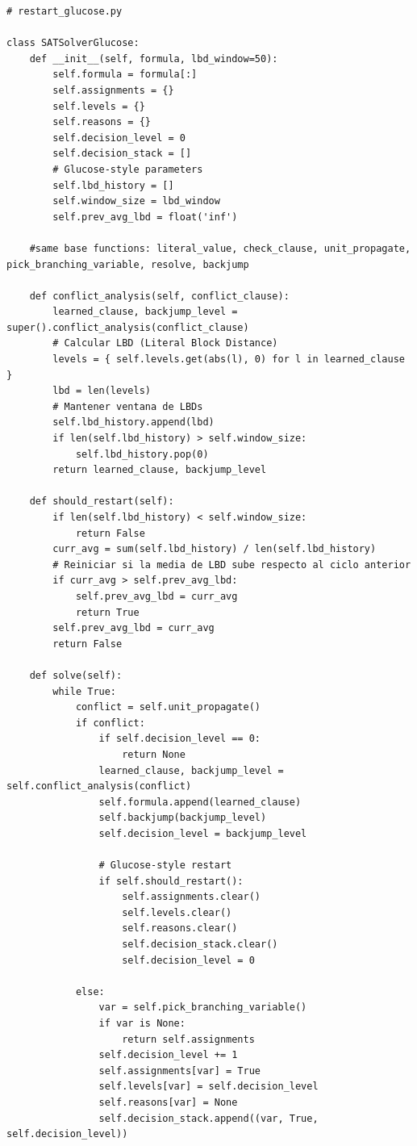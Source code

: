 \begin{lstlisting}
# restart_glucose.py

class SATSolverGlucose:
    def __init__(self, formula, lbd_window=50):
        self.formula = formula[:]  
        self.assignments = {}
        self.levels = {}
        self.reasons = {}
        self.decision_level = 0
        self.decision_stack = []
        # Glucose-style parameters
        self.lbd_history = []
        self.window_size = lbd_window
        self.prev_avg_lbd = float('inf')

    #same base functions: literal_value, check_clause, unit_propagate, pick_branching_variable, resolve, backjump

    def conflict_analysis(self, conflict_clause):
        learned_clause, backjump_level = super().conflict_analysis(conflict_clause)
        # Calcular LBD (Literal Block Distance)
        levels = { self.levels.get(abs(l), 0) for l in learned_clause }
        lbd = len(levels)
        # Mantener ventana de LBDs
        self.lbd_history.append(lbd)
        if len(self.lbd_history) > self.window_size:
            self.lbd_history.pop(0)
        return learned_clause, backjump_level

    def should_restart(self):
        if len(self.lbd_history) < self.window_size:
            return False
        curr_avg = sum(self.lbd_history) / len(self.lbd_history)
        # Reiniciar si la media de LBD sube respecto al ciclo anterior
        if curr_avg > self.prev_avg_lbd:
            self.prev_avg_lbd = curr_avg
            return True
        self.prev_avg_lbd = curr_avg
        return False

    def solve(self):
        while True:
            conflict = self.unit_propagate()
            if conflict:
                if self.decision_level == 0:
                    return None
                learned_clause, backjump_level = self.conflict_analysis(conflict)
                self.formula.append(learned_clause)
                self.backjump(backjump_level)
                self.decision_level = backjump_level

                # Glucose-style restart
                if self.should_restart():
                    self.assignments.clear()
                    self.levels.clear()
                    self.reasons.clear()
                    self.decision_stack.clear()
                    self.decision_level = 0

            else:
                var = self.pick_branching_variable()
                if var is None:
                    return self.assignments
                self.decision_level += 1
                self.assignments[var] = True
                self.levels[var] = self.decision_level
                self.reasons[var] = None
                self.decision_stack.append((var, True, self.decision_level))

\end{lstlisting}

